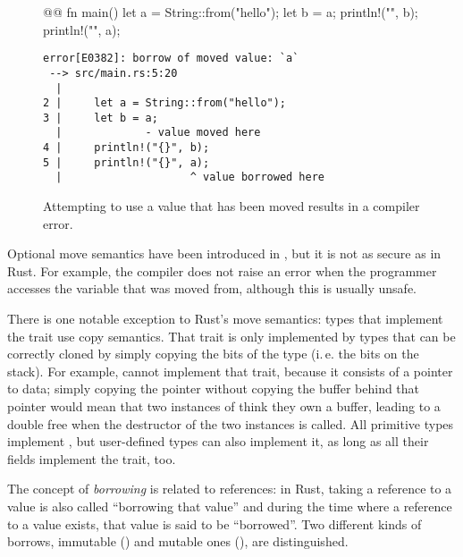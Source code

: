 {{\begin{figure}[t]
  \centering
  \begin{minipage}[t]{.5\textwidth}
    \begin{rustcode}
      @@
      fn main() {
          let a = String::from("hello");
          let b = a;
          println!("{}", b);
          println!("{}", a);
      }
    \end{rustcode}
  \end{minipage}
  \hspace{2mm}
  \begin{minipage}[t]{.47\textwidth}
    \footnotesize
    \vspace{1mm}
    \begin{verbatim}
error[E0382]: borrow of moved value: `a`
 --> src/main.rs:5:20
  |
2 |     let a = String::from("hello");
3 |     let b = a;
  |             - value moved here
4 |     println!("{}", b);
5 |     println!("{}", a);
  |                    ^ value borrowed here
    \end{verbatim}
  \end{minipage}
  \caption{Attempting to use a value that has been moved results in a compiler error.}
  \label{fig:string-move}
\end{figure}

Optional move semantics have been introduced in \cppeleven, but it is not as secure as in Rust.
For example, the \cpp compiler does not raise an error when the programmer accesses the variable that was moved from, although this is usually unsafe.

There is one notable exception to Rust's move semantics: types that implement the trait  use copy semantics.
That trait is only implemented by types that can be correctly cloned by simply copying the bits of the type (i.\,e. the bits on the stack).
For example,  cannot implement that trait, because it consists of a pointer to data; simply copying the pointer without copying the buffer behind that pointer would mean that two instances of  think they own a buffer, leading to a double free when the destructor of the two instances is called.
All primitive types implement , but user-defined types can also implement it, as long as all their fields implement the trait, too.

\vspace{8mm}

The concept of \emph{borrowing} is related to references:
in Rust, taking a reference to a value is also called \enquote{borrowing that value} and during the time where a reference to a value exists, that value is said to be \enquote{borrowed}.
Two different kinds of borrows, immutable () and mutable ones (), are distinguished.

}}
